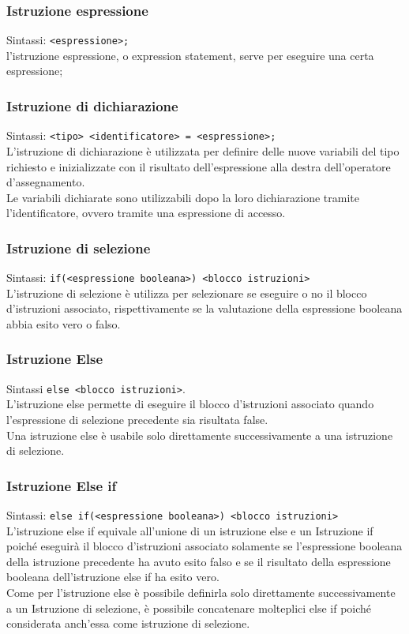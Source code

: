 \subsubsection{Istruzione espressione}
Sintassi: \verb|<espressione>;| \\
l'istruzione espressione, o expression statement, serve per eseguire una certa espressione; 


\subsubsection{Istruzione di dichiarazione}
Sintassi: \verb|<tipo> <identificatore> = <espressione>;| \\
L'istruzione di dichiarazione è utilizzata per definire delle nuove variabili del tipo 
richiesto e inizializzate con il risultato dell'espressione alla destra dell'operatore d'assegnamento. \\
Le variabili dichiarate sono utilizzabili dopo la loro dichiarazione tramite l'identificatore, ovvero
tramite una espressione di accesso. 

\subsubsection{Istruzione di selezione}
Sintassi: \verb|if(<espressione booleana>) <blocco istruzioni>| \\
L'istruzione di selezione è utilizza per selezionare se eseguire o no il blocco d'istruzioni
associato, rispettivamente se la valutazione della espressione booleana abbia esito vero o falso.

\subsubsection{Istruzione Else}
Sintassi \verb|else <blocco istruzioni>|. \\
L'istruzione else permette di eseguire il blocco d'istruzioni associato quando l'espressione
di selezione precedente sia risultata false. \\
Una istruzione else è usabile solo direttamente successivamente a una istruzione di selezione.

\subsubsection{Istruzione Else if}
Sintassi: \verb|else if(<espressione booleana>) <blocco istruzioni>| \\
L'istruzione else if equivale all'unione di un istruzione else e un Istruzione if poiché 
eseguirà il blocco d'istruzioni associato solamente se l'espressione booleana della 
istruzione precedente ha avuto esito falso e se il risultato della espressione booleana 
dell'istruzione else if ha esito vero. \\
Come per l'istruzione else è possibile definirla solo direttamente successivamente a un Istruzione 
di selezione, è possibile concatenare molteplici else if poiché considerata anch'essa come 
istruzione di selezione.

